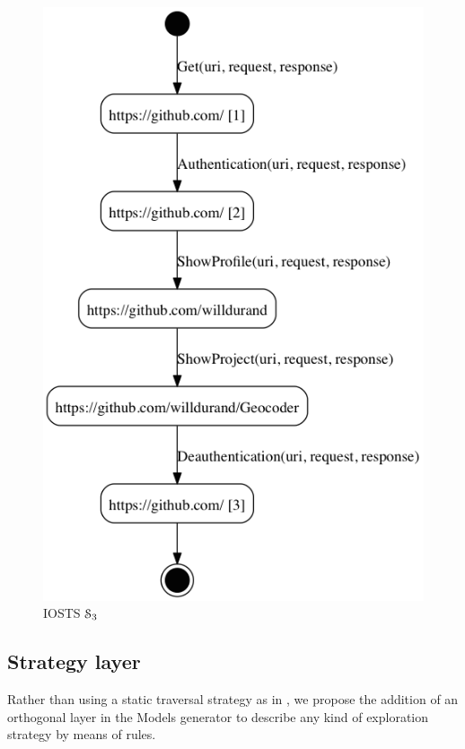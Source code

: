 \begin{figure}[ht]
    \begin{center}
    \includegraphics[width=0.6\linewidth]{figures/gh-iosts-41.png}
    \caption {IOSTS $\EuScript{S}_3$}
    \label{fig:github:iosts:4}
    \end{center}
\end{figure}

\subsection{Strategy layer}
\label{sec:modelinf:webapps:strategy}

Rather than using a static traversal strategy as in
\cite{Memon:2003,concolicandroid12,crawljax:tweb12,
Amalfitano:2012:UGR:2351676.2351717, WPX13}, we propose the
addition of an orthogonal layer in the Models generator to
describe any kind of exploration strategy by means of rules.

